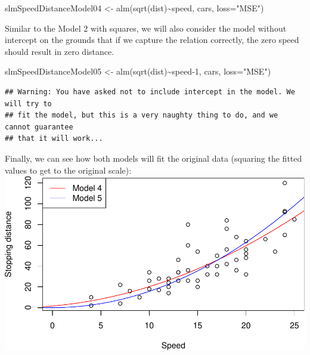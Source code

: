 \documentclass[
]{book}
\newenvironment{Shaded}{\begin{snugshade}}{\end{snugshade}}
\newcommand{\AttributeTok}[1]{\textcolor[rgb]{0.77,0.63,0.00}{#1}}
\newcommand{\DecValTok}[1]{\textcolor[rgb]{0.00,0.00,0.81}{#1}}
\newcommand{\FunctionTok}[1]{\textcolor[rgb]{0.00,0.00,0.00}{#1}}
\newcommand{\NormalTok}[1]{#1}
\newcommand{\OtherTok}[1]{\textcolor[rgb]{0.56,0.35,0.01}{#1}}
\newcommand{\SpecialCharTok}[1]{\textcolor[rgb]{0.00,0.00,0.00}{#1}}
\newcommand{\StringTok}[1]{\textcolor[rgb]{0.31,0.60,0.02}{#1}}
\theoremstyle{definition}
\theoremstyle{definition}
\theoremstyle{definition}
\theoremstyle{definition}
\theoremstyle{remark}
\begin{document}
\begin{Shaded}
\begin{Highlighting}[]
\NormalTok{slmSpeedDistanceModel04 }\OtherTok{\textless{}{-}} \FunctionTok{alm}\NormalTok{(}\FunctionTok{sqrt}\NormalTok{(dist)}\SpecialCharTok{\textasciitilde{}}\NormalTok{speed, cars, }\AttributeTok{loss=}\StringTok{"MSE"}\NormalTok{)}
\end{Highlighting}
\end{Shaded}

Similar to the Model 2 with squares, we will also consider the model without intercept on the grounds that if we capture the relation correctly, the zero speed should result in zero distance.

\begin{Shaded}
\begin{Highlighting}[]
\NormalTok{slmSpeedDistanceModel05 }\OtherTok{\textless{}{-}} \FunctionTok{alm}\NormalTok{(}\FunctionTok{sqrt}\NormalTok{(dist)}\SpecialCharTok{\textasciitilde{}}\NormalTok{speed}\DecValTok{{-}1}\NormalTok{, cars, }\AttributeTok{loss=}\StringTok{"MSE"}\NormalTok{)}
\end{Highlighting}
\end{Shaded}

\begin{verbatim}
## Warning: You have asked not to include intercept in the model. We will try to
## fit the model, but this is a very naughty thing to do, and we cannot guarantee
## that it will work...
\end{verbatim}

Finally, we can see how both models will fit the original data (squaring the fitted values to get to the original scale):
\includegraphics{Svetunkov---Statistics-for-Business-Analytics_files/figure-latex/speedDistanceSqrt02-1.pdf}
\end{document}
